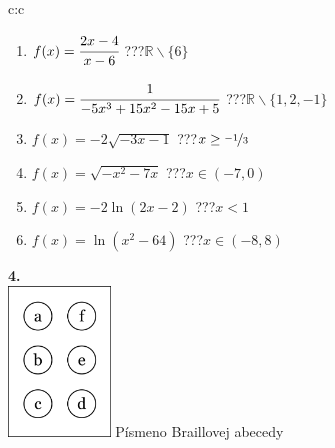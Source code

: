 \documentclass[10pt]{report}
\begin{document}
\begin{tabular}{c:c}
\begin{minipage}[c][104.5mm][t]{0.5\linewidth}
\begin{center}
\begin{minipage}{0.79\linewidth}
\begin{center}
\begin{varwidth}{\linewidth}
\begin{enumerate}
\normalsizerrr
\item $f(x)=\cfrac{2x-4}{x-6}$\quad \dotfill\; ???\;\dotfill \quad $\mathbb{R}\smallsetminus\{6\}$
\item $f(x)=\cfrac{1}{-5x^3+15x^2-15x+5}$\quad \dotfill\; ???\;\dotfill \quad $\mathbb{R}\smallsetminus\{1,2,-1\}$
\item $f(x)=-2\sqrt{-3x-1}$\quad \dotfill\; ???\;\dotfill \quad $x\geq\nicefrac{-1}{3}$
\item $f(x)=\sqrt{-x^2-7x}$\quad \dotfill\; ???\;\dotfill \quad $x\in(-7 , 0)$
\item $f(x)=-2\ln{(2x-2)}$\quad \dotfill\; ???\;\dotfill \quad $x<1$
\item $f(x)=\ln{(x^2-64)}$\quad \dotfill\; ???\;\dotfill \quad $x\in(-8 , 8)$
\end{enumerate}
\end{varwidth}
\end{center}
\end{minipage}
\begin{minipage}{0.20\linewidth}
\begin{center}
{\Huge\bfseries 4.} \\[2mm]
\includegraphics[height=40mm]{../images/braille.png}
{\small Písmeno Braillovej abecedy}
\end{center}
\end{minipage}
\end{center}
\end{minipage}
%
\end{tabular}
\newpage
\thispagestyle{empty}
\end{document}
